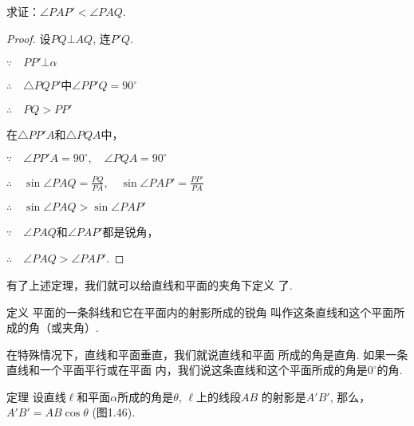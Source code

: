 求证：$\angle PAP'<\angle PAQ$.

\begin{figure}[htp]
  \centering
{}
  \caption{}
\end{figure}

\begin{proof}
  设$PQ\bot AQ$, 连$P'Q$.

  $\because\quad PP'\bot\alpha$

$\therefore\quad \triangle PQP'$中$\angle PP'Q=90^{\circ}$

$\therefore\quad PQ>PP'$

在$\triangle PP'A$和$\triangle PQA$中，

$\because\quad \angle PP'A=90^{\circ},\quad \angle PQA=90^{\circ}$

$\therefore\quad \sin\angle PAQ=\frac{PQ}{PA},\quad \sin\angle PAP'=\frac{PP'}{PA}$

$\therefore\quad \sin\angle  PAQ>\sin\angle PAP'$

$\because\quad \angle PAQ$和$\angle PAP'$都是锐角，

$\therefore\quad \angle PAQ>\angle PAP'$.
\end{proof}

有了上述定理，我们就可以给直线和平面的夹角下定义
了. 


\begin{blk}
  {定义} 平面的一条斜线和它在平面内的射影所成的锐角
叫作这条直线和这个平面所成的角（或夹角）. 
\end{blk}

在特殊情况下，直线和平面垂直，我们就说直线和平面
所成的角是直角. 如果一条直线和一个平面平行或在平面
内，我们说这条直线和这个平面所成的角是$0^{\circ}$的角. 


\begin{blk}
  {定理} 设直线$\ell$和平面$\alpha$所成的角是$\theta$, $\ell$上的线段$AB$
的射影是$A'B'$, 那么，
$A'B'=AB\cos\theta$ (图1.46).
\end{blk}


